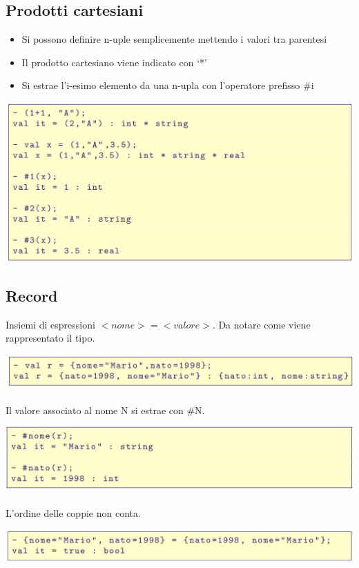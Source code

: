 \documentclass[10pt]{article}
\begin{document}
\subsection{Prodotti cartesiani}
\begin{itemize}
    \item Si possono definire n-uple semplicemente mettendo i valori tra
parentesi
\item Il prodotto cartesiano viene indicato con ‘*’
\item Si estrae l’i-esimo elemento da una n-upla con l’operatore
prefisso \#i
\end{itemize}
\includegraphics[scale=0.2]{Immagini/ml8.png}
\subsection{Record}
Insiemi di espressioni $<nome>=<valore>$. Da notare come viene
rappresentato il tipo.

\includegraphics[scale=0.2]{Immagini/ml9.png}
\\\\
Il valore associato al nome N si estrae con \#N.

\includegraphics[scale=0.2]{Immagini/ml10.png}
\\\\
L’ordine delle coppie non conta.

\includegraphics[scale=0.2]{Immagini/ml11.png}
\end{document}

